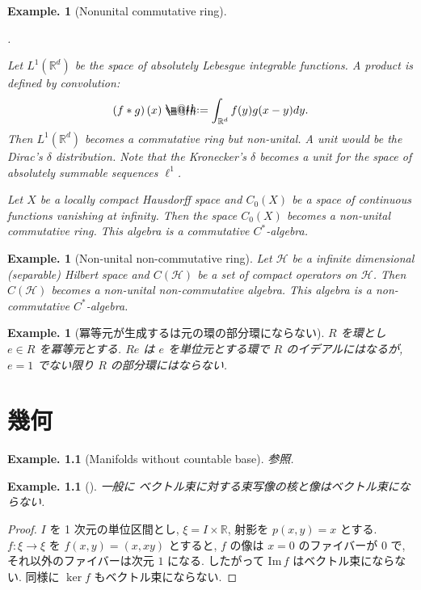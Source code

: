 \documentclass[openany, a4paper, oneside]{jsbook}
\makeatletter
\newcounter{enum2}
\renewenvironment{enumerate}{%
\begin{list}%
{%
\arabic{enum2}.\ \,%
}%
{%
\usecounter{enum2}
\setlength{\itemindent}{0pt}%
\setlength{\leftmargin}{15pt}%
\setlength{\rightmargin}{0pt}%
\setlength{\labelsep}{0pt}%
\setlength{\labelwidth}{6pt}%
\setlength{\itemsep}{0pt}%
\setlength{\parsep}{0pt}%
\setlength{\listparindent}{0pt}%
}
}{%
\end{list}%
}
\newcommand*{\defeq}{\mathrel{\rlap{%
\raisebox{0.3ex}{$\m@th\cdot$}}%
\raisebox{-0.3ex}{$\m@th\cdot$}}%
=}
\theoremstyle{break}
\theoremstyle{breakdefn}
\newtheorem{ex}[thm]{Example.}
\newcommand{\rbk}[1]{\left (#1\right)}
\newcommand{\bbR}{\mathbb{R}}
\newcommand{\bbRd}{\mathbb{R}^d}
\newcommand{\calH}{\mathcal{H}}
\newcommand{\Image}{\mathrm{Im}\,}
\makeatother
\begin{document}
\begin{ex}[Nonunital commutative ring]
\begin{enumerate}
\item Let $L^1(\bbRd)$ be the space of absolutely Lebesgue integrable functions.
    A product is defined by convolution:
    \begin{align}
     \rbk{f * g} (x)
     \defeq
     \int_{\bbRd} f(y) g(x - y) dy.
    \end{align}
    Then $L^1(\bbRd)$ becomes a commutative ring but non-unital.
    A unit would be the Dirac's $\delta$ distribution.
    Note that the Kronecker's $\delta$ becomes a unit for the space of absolutely summable sequences $\ell^1$.
\item Let $X$ be a locally compact Hausdorff space and $C_0(X)$ be a space of continuous functions vanishing at infinity.
    Then the space $C_0(X)$ becomes a non-unital commutative ring.
    This algebra is a commutative $C^*$-algebra.
\end{enumerate}
\end{ex}
\begin{ex}[Non-unital non-commutative ring]
 Let $\calH$ be a infinite dimensional (separable) Hilbert space and $C \rbk{\calH}$ be a set of compact operators on $\calH$.
 Then $C (\calH)$ becomes a non-unital non-commutative algebra.
 This algebra is a non-commutative $C^*$-algebra.
\end{ex}
\begin{ex}[冪等元が生成するは元の環の部分環にならない]
 $R$ を環とし $e \in R$ を冪等元とする.
 $Re$ は $e$ を単位元とする環で $R$ のイデアルにはなるが, $e = 1$ でない限り $R$ の部分環にはならない.
\end{ex}
\chapter{幾何}


\begin{ex}[Manifolds without countable base]
\cite{CalabiRosenlicht1} 参照.
\end{ex}

\begin{ex}[\cite{RichardGSwan1}]
一般に ベクトル束に対する束写像の核と像はベクトル束にならない.
\end{ex}
\begin{proof}
$I$ を 1 次元の単位区間とし, $\xi = I \times \bbR$, 射影を $p(x,y) = x$ とする.
$f \colon \xi \to \xi$ を $f(x,y) = (x, xy)$ とすると,
$f$ の像は $x = 0$ のファイバーが $0$ で, それ以外のファイバーは次元 $1$ になる.
したがって $\Image f$ はベクトル束にならない.
同様に $\ker f$ もベクトル束にならない.
\end{proof}
\end{document}
